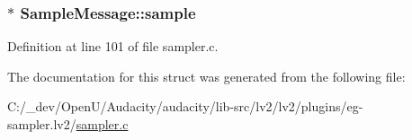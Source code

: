 \subsubsection[{\texorpdfstring{sample}{sample}}]{$\ast$ Sample\+Message\+::sample}\hypertarget{struct_sample_message_a22c0861fe3a8b5d0569509fe1ea58b66}{}\label{struct_sample_message_a22c0861fe3a8b5d0569509fe1ea58b66}


Definition at line 101 of file sampler.\+c.



The documentation for this struct was generated from the following file\+:\begin{DoxyCompactItemize}
\item 
C\+:/\+\_\+dev/\+Open\+U/\+Audacity/audacity/lib-\/src/lv2/lv2/plugins/eg-\/sampler.\+lv2/\hyperlink{lv2_2lv2_2plugins_2eg-sampler_8lv2_2sampler_8c}{sampler.\+c}\end{DoxyCompactItemize}
